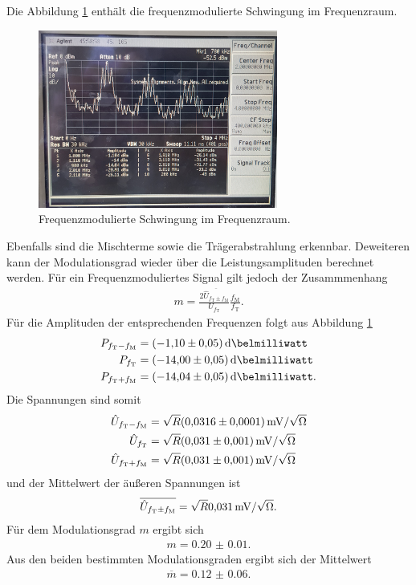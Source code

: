 Die Abbildung \ref{fig:frequenz_freq} enthält die frequenzmodulierte Schwingung
im Frequenzraum.
\begin{figure}
  \centering
  \includegraphics[width=0.7\textwidth]{spec/frequenzmodulation_bereich_fresh_cool.jpg}
  \caption{Frequenzmodulierte
Schwingung im Frequenzraum.}
\label{fig:frequenz_freq}
\end{figure}
Ebenfalls sind die Mischterme sowie die Trägerabstrahlung erkennbar.
Deweiteren kann der Modulationsgrad wieder
über die Leistungsamplituden berechnet werden.
Für ein Frequenzmoduliertes Signal gilt jedoch der Zusammmenhang
\begin{align}
m=\frac{2\overline{\hat{U}_{f_{\text{T}}\pm f_{\text{M}}}}}{U_{f_{\text{T}}}} \frac{f_{\text{M}}}{f_{\text{T}}}. \label{eqn:m_leistung_f}
\end{align}
Für die Amplituden der entsprechenden Frequenzen
folgt aus Abbildung \ref{fig:frequenz_freq}
\begin{align}
P_{f_{\text{T}}-f_{\text{M}}}&=\SI{-1.10(5)}{\deci\belmilliwatt}\\
P_{f_{\text{T}}}&=\SI{-14.00(5)}{\deci\belmilliwatt}\\
P_{f_{\text{T}}+f_{\text{M}}}&=\SI{-14.04(5)}{\deci\belmilliwatt}.
\end{align}
Die Spannungen sind somit
\begin{align}
   \hat{U}_{f_{\text{T}}-f_{\text{M}}}&=\sqrt{R}\SI{0.0316(1)}{\milli\volt\per\sqrt{\ohm}}\\
  \hat{U}_{f_{\text{T}}}&=\sqrt{R}\SI{0.031(1)}{\milli\volt\per\sqrt{\ohm}}\\
  \hat{U}_{f_{\text{T}}+f_{\text{M}}}&=\sqrt{R}\SI{0.031(1)}{\milli\volt\per\sqrt{\ohm}}
\end{align}
und der Mittelwert der äußeren Spannungen ist
\begin{align}
  \overline{\hat{U}_{f_{\text{T}}\pm f_{\text{M}}}} = \sqrt{R}\SI{0.031(0)}{\milli\volt\per\sqrt{\ohm}}.
\end{align}
Für
dem Modulationsgrad $m$ ergibt sich
\begin{align}
m=\num{0.20(1)}.
\end{align}
Aus den beiden bestimmten Modulationsgraden
ergibt sich der Mittelwert
\begin{align}
\overline{m}=\num{0.12(6)}.
\end{align}




